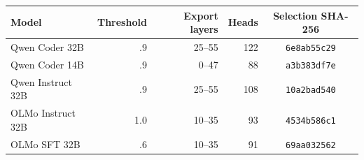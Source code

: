 \begin{tabular}{lrrrc}\toprule
Model & Threshold & Export layers & Heads & Selection SHA-256\\\midrule
Qwen Coder 32B & .9 & 25--55 & 122 & \texttt{6e8ab55c29}\\
Qwen Coder 14B & .9 & 0--47 & 88 & \texttt{a3b383df7e}\\
Qwen Instruct 32B & .9 & 25--55 & 108 & \texttt{10a2bad540}\\
OLMo Instruct 32B & 1.0 & 10--35 & 93 & \texttt{4534b586c1}\\
OLMo SFT 32B & .6 & 10--35 & 91 & \texttt{69aa032562}\\
\bottomrule\end{tabular}